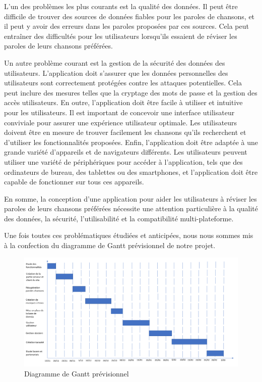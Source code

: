 \documentclass[12pt,french]{article}
\begin{document}
L'un des problèmes les plus courants est la qualité des données. Il peut être difficile de trouver des sources de données fiables pour les paroles de chansons, et il peut y avoir des erreurs dans les paroles proposées par ces sources. Cela peut entraîner des difficultés pour les utilisateurs lorsqu'ils essaient de réviser les paroles de leurs chansons préférées.
\newline

Un autre problème courant est la gestion de la sécurité des données des utilisateurs. L'application doit s'assurer que les données personnelles des utilisateurs sont correctement protégées contre les attaques potentielles. Cela peut inclure des mesures telles que la cryptage des mots de passe et la gestion des accès utilisateurs.
En outre, l'application doit être facile à utiliser et intuitive pour les utilisateurs. Il est important de concevoir une interface utilisateur conviviale pour assurer une expérience utilisateur optimale. Les utilisateurs doivent être en mesure de trouver facilement les chansons qu'ils recherchent et d'utiliser les fonctionnalités proposées.
\newline
Enfin, l'application doit être adaptée à une grande variété d'appareils et de navigateurs différents. Les utilisateurs peuvent utiliser une variété de périphériques pour accéder à l'application, tels que des ordinateurs de bureau, des tablettes ou des smartphones, et l'application doit être capable de fonctionner sur tous ces appareils.
\newline

En somme, la conception d'une application pour aider les utilisateurs à réviser les paroles de leurs chansons préférées nécessite une attention particulière à la qualité des données, la sécurité, l'utilisabilité et la compatibilité multi-plateforme.
\newline
\newline

Une fois toutes ces problématiques étudiées et anticipées, nous nous sommes mis à la confection du diagramme de Gantt prévisionnel de notre projet.



\begin{figure}[H]
	\centering
	\includegraphics[scale=0.5]{ganttprevi.png}
	\caption{Diagramme de Gantt prévisionnel}    
\end{figure}
\end{document}
